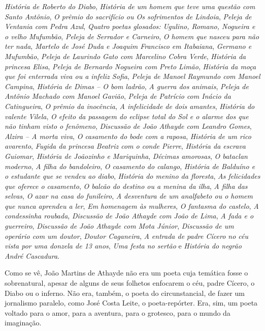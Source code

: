\textit{História de Roberto do Diabo}, \textit{História de um homem que
teve uma questão com Santo Antônio}, \textit{O prêmio do sacrifício
ou Os sofrimentos de Lindoia}, \textit{Peleja de Ventania com Pedra
Azul}, \textit{Quatro poetas glosados: Ugulino, Romano, Nogueira
e o velho Mufumbão}, \textit{Peleja de Serrador e Carneiro}, \textit{O
homem que nasceu para não ter nada}, \textit{Martelo de José Duda
e Joaquim Francisco em Itabaiana}, \textit{Germano e Mufumbão},
\textit{Peleja de Laurindo Gato com Marcelino Cobra Verde},
\textit{História da princesa Elisa}, \textit{Peleja de Bernardo Nogueira
com Preto Limão}, \textit{História da moça que foi enterrada viva
ou a infeliz Sofia}, \textit{Peleja de Manoel Raymundo com Manoel
Campina}, \textit{História de Dimas -- O bom ladrão}, \textit{A guerra
dos animais}, \textit{Peleja de Antônio Machado com Manoel
Gavião}, \textit{Peleja de Patrício com Inácio da Catingueira}, \textit{O
prêmio da inocência}, \textit{A infelicidade de dois amantes}, \textit{História
do valente Vilela}, \textit{O efeito da passagem do eclipse total do
Sol e o alarme dos que não tinham visto o fenômeno},
\textit{Discussão de João Athayde com Leandro Gomes}, \textit{Alzira --
A morta viva}, \textit{O casamento do bode com a raposa}, \textit{História
de um rico avarento}, \textit{Fugida da princesa Beatriz com o conde
Pierre}, \textit{História da escrava Guiomar}, \textit{História de Joãozinho
e Mariquinha}, \textit{Décimas amorosas}, \textit{O bataclan moderno}, \textit{A
filha do bandoleiro}, \textit{O casamento do calango}, \textit{História de
Balduíno e o estudante que se vendeu ao diabo}, \textit{História do
menino da floresta}, \textit{As felicidades que oferece o casamento},
\textit{O balcão do destino ou a menina da ilha}, \textit{A filha das selvas},
\textit{O azar na casa do funileiro}, \textit{A desventura de um analfabeto
ou o homem que nunca aprendeu a ler}, \textit{Em homenagem às
mulheres}, \textit{O fantasma do castelo}, \textit{A condessinha roubada},
\textit{Discussão de João Athayde com João de Lima}, \textit{A fada e o
guerreiro}, \textit{Discussão de João Athayde com Mota Júnior},
\textit{Discussão de um operário com um doutor}, \textit{Doutor Caganeira},
\textit{A entrada de padre Cícero no céu vista por uma donzela de
13 anos}, \textit{Uma festa no sertão} e \textit{História do negrão André
Cascadura}.

Como se vê, João Martins de Athayde não era um poeta
cuja temática fosse o sobrenatural, apesar de alguns de seus
folhetos enfocarem o céu, padre Cícero, o Diabo ou o
inferno. Não era, também, o poeta do circunstancial, de
fazer um jornalismo paralelo, como José Costa Leite, o
poeta-repórter. Era, sim, um poeta voltado para o amor,
para a aventura, para o grotesco, para o mundo da
imaginação.

